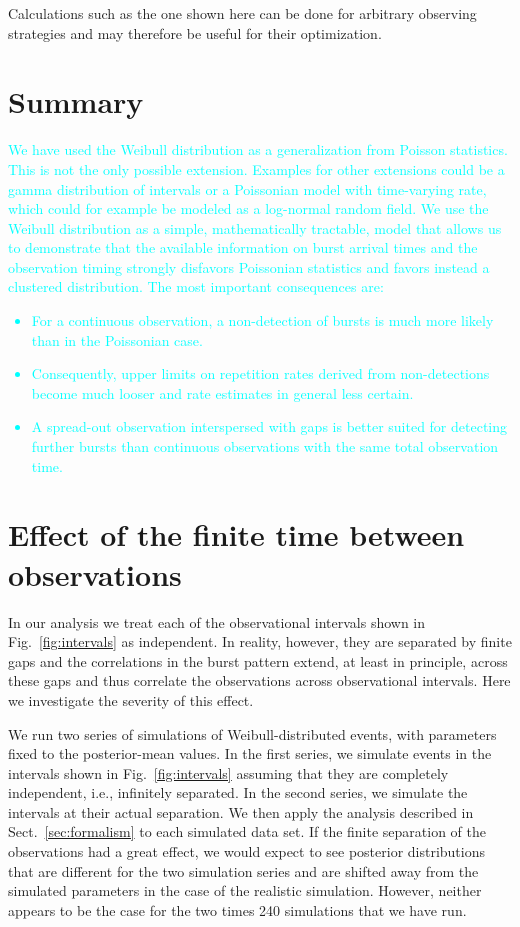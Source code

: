 \documentclass[fleqn,usenatbib]{mnras}
\newcommand{\new}[1]{\textcolor{cyan}{#1}}
\begin{document}
Calculations such as the one shown here can be done for arbitrary observing strategies and may therefore be useful for their optimization.


\section{Summary}
\label{sec:summary}


\new{We have used the Weibull distribution as a generalization from Poisson statistics. This is not the only possible extension. Examples for other extensions could be a gamma distribution of intervals or a Poissonian model with time-varying rate, which could for example be modeled as a log-normal random field. We use the Weibull distribution as a simple, mathematically tractable, model that allows us to demonstrate that the available information on burst arrival times and the observation timing strongly disfavors Poissonian statistics and favors instead a clustered distribution. The most important consequences are:
\begin{itemize}
	\item For a continuous observation, a non-detection of bursts is much more likely than in the Poissonian case.
	\item Consequently, upper limits on repetition rates derived from non-detections become much looser and rate estimates in general less certain.
	\item A spread-out observation interspersed with gaps is better suited for detecting further bursts than continuous observations with the same total observation time.
\end{itemize}}



\appendix
\section{Effect of the finite time between observations}
\label{sec:finiteness}

In our analysis we treat each of the observational intervals shown in Fig.~\ref{fig:intervals} as independent. In reality, however, they are separated by finite gaps and the correlations in the burst pattern extend, at least in principle, across these gaps and thus correlate the observations across observational intervals. Here we investigate the severity of this effect.

We run two series of simulations of Weibull-distributed events, with parameters fixed to the posterior-mean values. In the first series, we simulate events in the intervals shown in Fig.~\ref{fig:intervals} assuming that they are completely independent, i.e., infinitely separated. In the second series, we simulate the intervals at their actual separation. We then apply the analysis described in Sect.~\ref{sec:formalism} to each simulated data set. If the finite separation of the observations had a great effect, we would expect to see posterior distributions that are different for the two simulation series and are shifted away from the simulated parameters in the case of the realistic simulation. However, neither appears to be the case for the two times 240 simulations that we have run.
\end{document}

